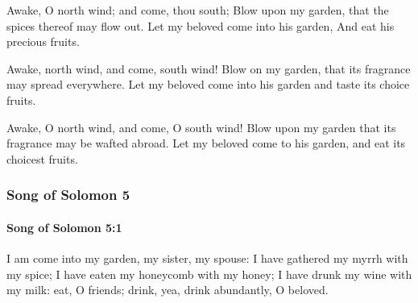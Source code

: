 			\begin{versebox}
					\item[BHS] 
					\item[LXX] 
					\item[ASV] Awake, O north wind; and come, thou south; Blow upon my garden, that the spices thereof may flow out. Let my beloved come into his garden, And eat his precious fruits.
					\item[NIV] Awake, north wind, and come, south wind! Blow on my garden, that its fragrance may spread everywhere. Let my beloved come into his garden and taste its choice fruits.
					\item[NRSV] Awake, O north wind, and come, O south wind! Blow upon my garden that its fragrance may be wafted abroad. Let my beloved come to his garden, and eat its choicest fruits.
			\end{versebox}
	\subsubsection{Song of Solomon 5} %
		\label{SONGOFSOLOMON-5}

		\paragraph{Song of Solomon 5:1} %
			\label{SONGOFSOLOMON-5-1}

			I am come into my garden, my sister, my spouse: I have gathered my myrrh with my spice; I have eaten my honeycomb with my honey; I have drunk my wine with my milk: eat, O friends; drink, yea, drink abundantly, O beloved.

